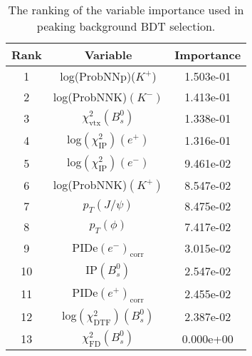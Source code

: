  \begin{table}[htb]
  \caption{
    The ranking of the variable importance used in peaking background BDT selection.
}
    \small{
\begin{center} \begin{tabular}{ccc}
    \hline
   Rank&Variable & Importance  \\
    \hline
  1&log(ProbNNp)($K^{+}$) & 1.503e-01 \\
  2&log(ProbNNK)$(K^{-})$ & 1.413e-01 \\
  3&$\chi^{2}_{\text{vtx}}(B^{0}_{s})$ & 1.338e-01 \\
  4&log$(\chi^{2}_{\text{IP}})(e^{+})$ & 1.316e-01 \\
  5&log$(\chi^{2}_{\text{IP}})(e^{-})$ & 9.461e-02 \\
  6&log(ProbNNK)$(K^{+})$ & 8.547e-02 \\
  7&$p_{T}(J/\psi)$ & 8.475e-02 \\
  8&$p_{T}(\phi)$ & 7.417e-02 \\
  9&PIDe$(e^{-})_{\text{corr}}$ & 3.015e-02 \\
  10&IP$(B^{0}_{s})$ & 2.547e-02 \\
  11&PIDe$(e^{+})_{\text{corr}}$ & 2.455e-02 \\
  12&log$(\chi^{2}_{\text{DTF}})(B^{0}_{s})$ & 2.387e-02 \\
  13&$\chi^{2}_{\text{FD}}(B^{0}_{s})$ & 0.000e+00 \\
  \hline
    \end{tabular}\end{center}
  }
\label{tab:RankingBDT2}
\end{table}

